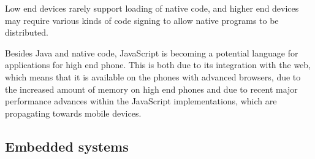 \documentclass[11pt]{report}
\begin{document}
Low end devices rarely support loading of native code, and higher end devices may require various kinds of code signing to allow native programs to be distributed.

Besides Java and native code, JavaScript is becoming a potential language for applications for high end phone. 
This is both due to its integration with the web, which means that it is available on the phones with advanced browsers, due to the increased amount of memory on high end phones
and due to recent major performance advances within the JavaScript implementations, which are propagating towards mobile devices.

\subsection{Embedded systems}
\end{document}
